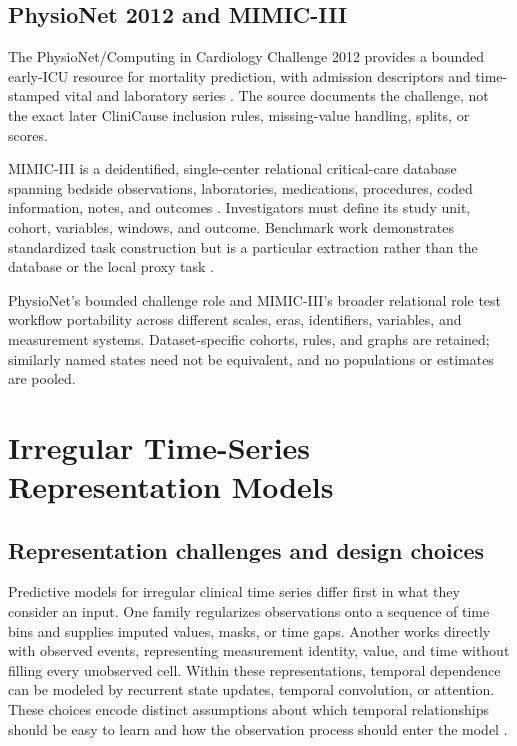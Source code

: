 \subsection{PhysioNet 2012 and MIMIC-III}

The PhysioNet/Computing in Cardiology Challenge 2012 provides a bounded early-ICU resource for mortality prediction, with admission descriptors and time-stamped vital and laboratory series \cite{silva2012physionet}.  The source documents the challenge, not the exact later CliniCause inclusion rules, missing-value handling, splits, or scores.

MIMIC-III is a deidentified, single-center relational critical-care database spanning bedside observations, laboratories, medications, procedures, coded information, notes, and outcomes \cite{johnson2016mimiciii}.  Investigators must define its study unit, cohort, variables, windows, and outcome.  Benchmark work demonstrates standardized task construction but is a particular extraction rather than the database or the local proxy task \cite{harutyunyan_2019_mimiciii_benchmark}.

PhysioNet's bounded challenge role and MIMIC-III's broader relational role test workflow portability across different scales, eras, identifiers, variables, and measurement systems.  Dataset-specific cohorts, rules, and graphs are retained; similarly named states need not be equivalent, and no populations or estimates are pooled.

\section{Irregular Time-Series Representation Models}
\label{sec:background-related-work:irregular-time-series-representation-models}

\subsection{Representation challenges and design choices}

Predictive models for irregular clinical time series differ first in what they consider an input.  One family regularizes observations onto a sequence of time bins and supplies imputed values, masks, or time gaps.  Another works directly with observed events, representing measurement identity, value, and time without filling every unobserved cell.  Within these representations, temporal dependence can be modeled by recurrent state updates, temporal convolution, or attention.  These choices encode distinct assumptions about which temporal relationships should be easy to learn and how the observation process should enter the model \cite{sun_2026_review_irregular_medical_timeseries}.

